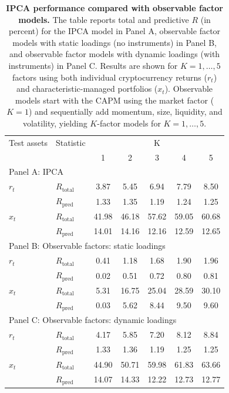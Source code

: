 \documentclass[
  12pt,
  a4paper,
  openany]{scrbook}
\begin{document}
\begin{table}
\centering
\small
\caption[IPCA performance compared with observable factor models]%
{%
\textbf{IPCA performance compared with observable factor models.}
The table reports total and predictive $R$ (in percent) for the IPCA model in Panel A, observable factor models with static loadings (no instruments) in Panel B, and observable factor models with dynamic loadings (with instruments) in Panel C. Results are shown for $K=1,\dots,5$ factors using both individual cryptocurrency returns ($r_t$) and characteristic-managed portfolios ($x_t$). Observable models start with the CAPM using the market factor ($K=1$) and sequentially add momentum, size, liquidity, and volatility, yielding $K$-factor models for $K=1,\dots,5$.
}
\label{tbl-model_comparison}
\vspace{5pt} %
\begin{tabular}{llccccc}
\toprule
Test assets & Statistic & \multicolumn{5}{c}{K} \\
\cmidrule(lr){3-7}
 &  & 1 & 2 & 3 & 4 & 5 \\
\midrule
\multicolumn{7}{l}{Panel A: IPCA} \\
\midrule
$r_t$ & $R_{\text{total}}$ & 3.87 & 5.45 & 6.94 & 7.79 & 8.50 \\
      & $R_{\text{pred}}$  & 1.33 & 1.35 & 1.19 & 1.24 & 1.25 \\
$x_t$ & $R_{\text{total}}$ & 41.98 & 46.18 & 57.62 & 59.05 & 60.68 \\
      & $R_{\text{pred}}$  & 14.01 & 14.16 & 12.16 & 12.59 & 12.65 \\
\midrule
\multicolumn{7}{l}{Panel B: Observable factors: static loadings} \\
\midrule
$r_t$ & $R_{\text{total}}$ & 0.41 & 1.18 & 1.68 & 1.90 & 1.96 \\
      & $R_{\text{pred}}$  & 0.02 & 0.51 & 0.72 & 0.80 & 0.81 \\
$x_t$ & $R_{\text{total}}$ & 5.31 & 16.75 & 25.04 & 28.59 & 30.10 \\
      & $R_{\text{pred}}$  & 0.03 & 5.62 & 8.44 & 9.50 & 9.60 \\
\midrule
\multicolumn{7}{l}{Panel C: Observable factors: dynamic loadings} \\
\midrule
$r_t$ & $R_{\text{total}}$ & 4.17 & 5.85 & 7.20 & 8.12 & 8.84 \\
      & $R_{\text{pred}}$  & 1.33 & 1.36 & 1.19 & 1.25 & 1.25 \\
$x_t$ & $R_{\text{total}}$ & 44.90 & 50.71 & 59.98 & 61.83 & 63.66 \\
      & $R_{\text{pred}}$  & 14.07 & 14.33 & 12.22 & 12.73 & 12.77 \\
\bottomrule
\end{tabular}
\end{table}
\end{document}
